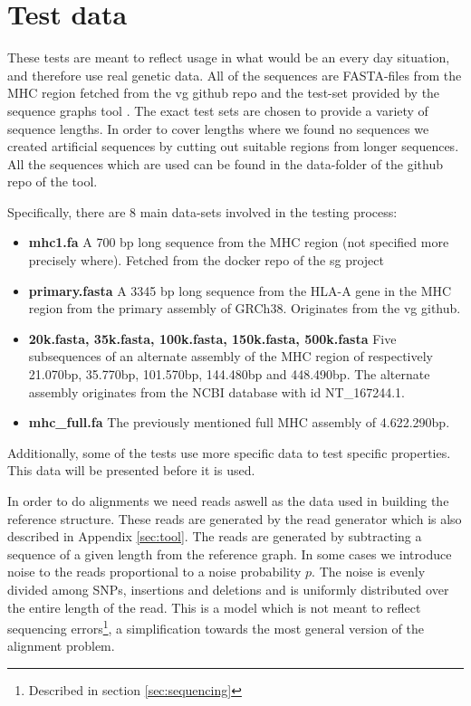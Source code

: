 \documentclass[thesis.tex]{subfiles}
\begin{document}
\section{Test data}
These tests are meant to reflect usage in what would be an every day situation, and therefore use real genetic data. All of the sequences are FASTA-files from the MHC region fetched from the vg github repo \cite{vg} and the test-set provided by the sequence graphs tool \cite{sequence_graphs}. The exact test sets are chosen to provide a variety of sequence lengths. In order to cover lengths where we found no sequences we created artificial sequences by cutting out suitable regions from longer sequences. All the sequences which are used can be found in the data-folder of the github repo of the tool.\\
\par\noindent
Specifically, there are 8 main data-sets involved in the testing process:
\begin{itemize}
  \item \textbf{mhc1.fa} A 700 bp long sequence from the MHC region (not specified more precisely where). Fetched from the docker repo of the sg project
  \item \textbf{primary.fasta} A 3345 bp long sequence from the HLA-A gene in the MHC region from the primary assembly of GRCh38. Originates from the vg github.
  \item \textbf{20k.fasta, 35k.fasta, 100k.fasta, 150k.fasta, 500k.fasta} Five subsequences of an alternate assembly of the MHC region of respectively 21.070bp, 35.770bp, 101.570bp, 144.480bp and 448.490bp. The alternate assembly originates from the NCBI database\cite{ncbi} with id NT\_167244.1.
  \item \textbf{mhc\_full.fa} The previously mentioned full MHC assembly of 4.622.290bp.
\end{itemize}
Additionally, some of the tests use more specific data to test specific properties. This data will be presented before it is used.\\
\par\noindent
In order to do alignments we need reads aswell as the data used in building the reference structure. These reads are generated by the read generator which is also described in Appendix \ref{sec:tool}. The reads are generated by subtracting a sequence of a given length from the reference graph. In some cases we introduce noise to the reads proportional to a noise probability $p$. The noise is evenly divided among SNPs, insertions and deletions and is uniformly distributed over the entire length of the read. This is a model which is not meant to reflect sequencing errors\footnote{Described in section \ref{sec:sequencing}}, a simplification towards the most general version of the alignment problem.\\
\end{document}
